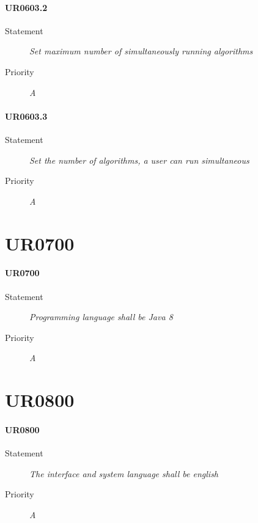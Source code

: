 \paragraph{UR0603.2}
\begin{description}
\item [Statement] \textit{
Set maximum number of simultaneously running algorithms
}
\item [Priority] \textit{A}
\end{description}

\paragraph{UR0603.3}
\begin{description}
\item [Statement] \textit{
Set the number of algorithms, a user can run simultaneous
}
\item [Priority] \textit{A}
\end{description}

\section{UR0700}

\paragraph{UR0700}
\begin{description}
\item [Statement] \textit{
Programming language shall be \gls{Java} 8
}
\item [Priority] \textit{A}
\end{description}

\section{UR0800}

\paragraph{UR0800}
\begin{description}
\item [Statement] \textit{
The interface and system language shall be english
}
\item [Priority] \textit{A}
\end{description}

